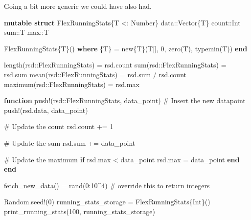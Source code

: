 \documentclass[
]{article}
\newenvironment{Shaded}{\begin{snugshade}}{\end{snugshade}}
\newcommand{\BuiltInTok}[1]{\textcolor[rgb]{0.00,0.23,0.31}{#1}}
\newcommand{\CommentTok}[1]{\textcolor[rgb]{0.37,0.37,0.37}{#1}}
\newcommand{\ControlFlowTok}[1]{\textcolor[rgb]{0.00,0.23,0.31}{\textbf{#1}}}
\newcommand{\DataTypeTok}[1]{\textcolor[rgb]{0.68,0.00,0.00}{#1}}
\newcommand{\FloatTok}[1]{\textcolor[rgb]{0.68,0.00,0.00}{#1}}
\newcommand{\FunctionTok}[1]{\textcolor[rgb]{0.28,0.35,0.67}{#1}}
\newcommand{\KeywordTok}[1]{\textcolor[rgb]{0.00,0.23,0.31}{\textbf{#1}}}
\newcommand{\NormalTok}[1]{\textcolor[rgb]{0.00,0.23,0.31}{#1}}
\newcommand{\OperatorTok}[1]{\textcolor[rgb]{0.37,0.37,0.37}{#1}}
\begin{document}
Going a bit more generic we could have also had,

\begin{Shaded}
\begin{Highlighting}[]
\KeywordTok{mutable struct}\NormalTok{ FlexRunningStats\{T }\OperatorTok{\textless{}:}\DataTypeTok{ Number}\NormalTok{\}}
\NormalTok{   data}\OperatorTok{::}\DataTypeTok{Vector\{T\}}
\NormalTok{   count}\OperatorTok{::}\DataTypeTok{Int}
\NormalTok{   sum}\OperatorTok{::}\DataTypeTok{T}
\NormalTok{   max}\OperatorTok{::}\DataTypeTok{T}

   \FunctionTok{FlexRunningStats}\DataTypeTok{\{T\}}\NormalTok{() }\KeywordTok{where}\NormalTok{ \{T\} }\OperatorTok{=} \FunctionTok{new}\DataTypeTok{\{T\}}\NormalTok{(T[], }\FloatTok{0}\NormalTok{, }\FunctionTok{zero}\NormalTok{(T), }\FunctionTok{typemin}\NormalTok{(T))}
\KeywordTok{end}

\FunctionTok{length}\NormalTok{(rsd}\OperatorTok{::}\DataTypeTok{FlexRunningStats}\NormalTok{) }\OperatorTok{=}\NormalTok{ rsd.count}
\FunctionTok{sum}\NormalTok{(rsd}\OperatorTok{::}\DataTypeTok{FlexRunningStats}\NormalTok{) }\OperatorTok{=}\NormalTok{ rsd.sum}
\FunctionTok{mean}\NormalTok{(rsd}\OperatorTok{::}\DataTypeTok{FlexRunningStats}\NormalTok{) }\OperatorTok{=}\NormalTok{ rsd.sum }\OperatorTok{/}\NormalTok{ rsd.count}
\FunctionTok{maximum}\NormalTok{(rsd}\OperatorTok{::}\DataTypeTok{FlexRunningStats}\NormalTok{) }\OperatorTok{=}\NormalTok{ rsd.max}

\KeywordTok{function} \FunctionTok{push!}\NormalTok{(rsd}\OperatorTok{::}\DataTypeTok{FlexRunningStats}\NormalTok{, data\_point)}
   \CommentTok{\# Insert the new datapoint}
   \FunctionTok{push!}\NormalTok{(rsd.data, data\_point)}

   \CommentTok{\# Update the count}
\NormalTok{   rsd.count }\OperatorTok{+=} \FloatTok{1}

   \CommentTok{\# Update the sum}
\NormalTok{   rsd.sum }\OperatorTok{+=}\NormalTok{ data\_point}

   \CommentTok{\# Update the maximum}
   \ControlFlowTok{if}\NormalTok{ rsd.max }\OperatorTok{\textless{}}\NormalTok{ data\_point}
\NormalTok{   rsd.max }\OperatorTok{=}\NormalTok{ data\_point}
   \ControlFlowTok{end}
\KeywordTok{end}

\FunctionTok{fetch\_new\_data}\NormalTok{() }\OperatorTok{=} \FunctionTok{rand}\NormalTok{(}\FloatTok{0}\OperatorTok{:}\FloatTok{10}\OperatorTok{\^{}}\FloatTok{4}\NormalTok{) }\CommentTok{\# override this to return integers}

\BuiltInTok{Random}\NormalTok{.}\FunctionTok{seed!}\NormalTok{(}\FloatTok{0}\NormalTok{)}
\NormalTok{running\_stats\_storage }\OperatorTok{=} \FunctionTok{FlexRunningStats}\DataTypeTok{\{Int\}}\NormalTok{()}
\FunctionTok{print\_running\_stats}\NormalTok{(}\FloatTok{100}\NormalTok{, running\_stats\_storage)}
\end{Highlighting}
\end{Shaded}
\end{document}
